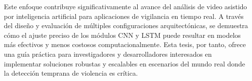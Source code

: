 Este enfoque contribuye significativamente al avance del 
análisis de video asistido por inteligencia artificial 
para aplicaciones de vigilancia en tiempo real. A través 
del diseño y evaluación de múltiples configuraciones 
arquitectónicas, se demuestra cómo el ajuste preciso de 
los módulos CNN y LSTM puede resultar en modelos más 
efectivos y menos costosos computacionalmente. Esta tesis, 
por tanto, ofrece una guía práctica para investigadores y 
desarrolladores interesados en implementar soluciones 
robustas y escalables en escenarios del mundo real donde 
la detección temprana de violencia es crítica.
